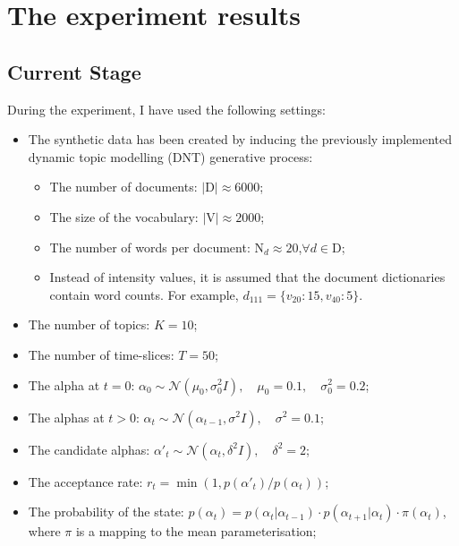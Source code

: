 \documentclass[12pt]{article}
\begin{document}
\section*{The experiment results}

\par

\subsection*{Current Stage}


\par During the experiment, I have used the following settings:
\begin{itemize}
\item The synthetic data has been created by inducing the previously implemented dynamic topic modelling (DNT) generative process:
\begin{itemize}
\item The number of documents: $|\mbox{D}|\approx6000$;
\item The size of the vocabulary: $|\mbox{V}|\approx2000$;
\item The number of words per document: $\mbox{N}_d\approx20$,\quad$\forall d \in \mbox{D}$;
\item Instead of intensity values, it is assumed that the document dictionaries contain word counts. For example, $d_{111}=\{v_{20}:15, v_{40}:5\}$. 
\end{itemize}
\item The number of topics: $K=10$;
\item The number of time-slices: $T=50$;
\item The alpha at $t=0$: $\alpha_0 \sim \mathcal{N}(\mu_0, \sigma^2_0I),\quad \mu_0 = 0.1,\quad\sigma_0^2 = 0.2$;
\item The alphas at $t>0$: $\alpha_t \sim \mathcal{N}(\alpha_{t-1}, \sigma^2I), \quad\sigma^2 = 0.1$;
\item The candidate alphas: $\alpha'_t \sim \mathcal{N}(\alpha_{t}, \delta^2I), \quad\delta^2 = 2$; 
\item The acceptance rate: $r_t=\min(1,p(\alpha'_t)/p(\alpha_t))$;
\item The probability of the state: $p(\alpha_t)=p(\alpha_{t} | \alpha_{t-1})\cdot p(\alpha_{t+1} | \alpha_{t})\cdot \pi(\alpha_t)$, where $\pi$ is a mapping to the mean parameterisation;
\end{itemize}
\end{document}
